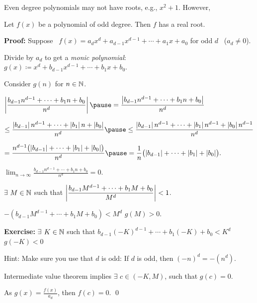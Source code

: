 \documentclass[10pt,aspectratio=169]{beamer}
\begin{document}
\begin{frame}
Even degree polynomials may not have roots, e.g., 
$x^2+1$.
\pause
However,

\begin{proposition}
Let $f(x)$ be a polynomial of odd degree.  Then $f$ has a real root.
\end{proposition}

\pause
\textbf{Proof:}
Suppose ~$f(x) = a_d x^d + a_{d-1} x^{d-1} + \cdots + a_1 x + a_0$ for odd
$d$ ~($a_d \not= 0$).

\pause
Divide by $a_d$ to get a \emph{monic polynomial}:
~ $g(x) \coloneqq x^d + b_{d-1} x^{d-1} + \cdots + b_1 x + b_0$.

\pause
\medskip

Consider $g(n)$ for $n \in {\mathbb{N}}$.

\pause
\medskip

$\displaystyle
\abs{\frac{b_{d-1} n^{d-1} + \cdots + b_1 n + b_0}{n^d}}
\pause
 =
\frac{\abs{b_{d-1} n^{d-1} + \cdots + b_1 n + b_0}}{n^d}
$

\pause
\medskip

\quad
$\displaystyle
\leq
\frac{\abs{b_{d-1}} n^{d-1} + \cdots + \abs{b_1} n + \abs{b_0}}{n^d}
\pause
\leq
\frac{\abs{b_{d-1}} n^{d-1} + \cdots + \abs{b_1} n^{d-1} + \abs{b_0} n^{d-1}}{n^d}
$

\pause
\medskip

\quad
$\displaystyle
=
\frac{n^{d-1}\bigl(\abs{b_{d-1}} + \cdots + \abs{b_1} + \abs{b_0}\bigr)}{n^d}
\pause
=
\frac{1}{n}
\bigl(\abs{b_{d-1}} + \cdots + \abs{b_1} + \abs{b_0}\bigr) .
$

\pause
\medskip

\thus \quad
$\displaystyle
\lim_{n\to\infty} \frac{b_{d-1} n^{d-1} + \cdots + b_1 n + b_0}{n^d}
= 0$.

\end{frame}

\begin{frame}

\thus \quad $\exists$ $M \in {\mathbb{N}}$ \quad such that 
\quad
$\displaystyle \left\lvert {\frac{b_{d-1} M^{d-1} + \cdots + b_1 M + b_0}{M^d}} \right\rvert < 1$.

\pause
\medskip

\thus \quad 
$\displaystyle
-(b_{d-1} M^{d-1} + \cdots + b_1 M + b_0) < M^d$
\pause
\wthus
$g(M) > 0$.

\pause
\medskip

\textbf{Exercise:}
$\exists$ $K \in {\mathbb{N}}$ such that
$b_{d-1} {(-K)}^{d-1} + \cdots + b_1 (-K) + b_0 < K^d$
\wthus $g(-K) < 0$

\pause
\medskip

Hint: Make sure you use that $d$ is odd: If $d$ is odd, then ${(-n)}^d = -(n^d)$.

\pause
\medskip

Intermediate value theorem implies $\exists$
$c \in (-K,M)$, such that $g(c) = 0$.

\pause
\medskip

As $g(x) = \frac{f(x)}{a_d}$, then $f(c) = 0$.
\qed
\end{frame}
\end{document}
